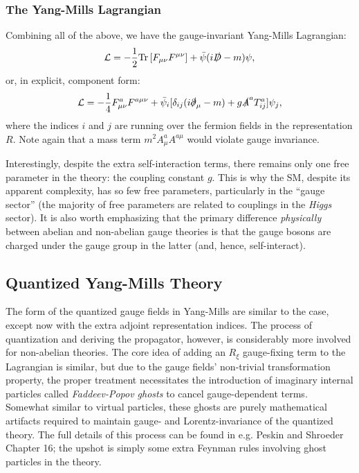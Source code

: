 \subsubsection{The Yang-Mills Lagrangian}

Combining all of the above, we have the gauge-invariant Yang-Mills Lagrangian:
\begin{equation}
	\label{eq:01_qft_gt_yangmills_lagrangian}
	\mathcal L = -\frac{1}{2}\tr{F_{\mu\nu}F^{\mu\nu}} + \bar\psi(i\cslashed D - m)\psi,
\end{equation}
or, in explicit, component form:
\begin{equation}
	\label{eq:01_qft_gt_yangmills_lagrangian_explicit}
	\mathcal L = -\frac{1}{4}F_{\mu\nu}^aF^{a\mu\nu} + \bar\psi_i[\delta_{ij}(i\cslashed \partial_\mu - m) + g\cslashed A^aT_{ij}^a]\psi_j,
\end{equation}
where the indices $i$ and $j$ are running over the fermion fields in the representation $R$.
Note again that a mass term $m^2A_\mu^aA^{a\mu}$ would violate gauge invariance.

Interestingly, despite the extra self-interaction terms, there remains only one free parameter in the theory: the coupling constant $g$.
This is why the SM, despite its apparent complexity, has so few free parameters, particularly in the ``gauge sector'' (the majority of free parameters are related to couplings in the \textit{Higgs} sector).
It is also worth emphasizing that the primary difference \textit{physically} between abelian and non-abelian gauge theories is that the gauge bosons are charged under the gauge group in the latter (and, hence, self-interact).



\subsection{Quantized Yang-Mills Theory}
\label{sec:01_qft_gt_ymquant}

The form of the quantized gauge fields in Yang-Mills are similar to the \UU[1] case, except now with the extra adjoint representation indices.
The process of quantization and deriving the propagator, however, is considerably more involved for non-abelian theories.
The core idea of adding an $R_\xi$ gauge-fixing term to the Lagrangian is similar, but due to the gauge fields' non-trivial transformation property, the proper treatment necessitates the introduction of imaginary internal particles called \textit{Faddeev-Popov ghosts} to cancel gauge-dependent terms.
Somewhat similar to virtual particles, these ghosts are purely mathematical artifacts required to maintain gauge- and Lorentz-invariance of the quantized theory.
The full details of this process can be found in e.g. Peskin and Shroeder~\cite{Peskin:1995ev} Chapter 16; the upshot is simply some extra Feynman rules involving ghost particles in the theory.

